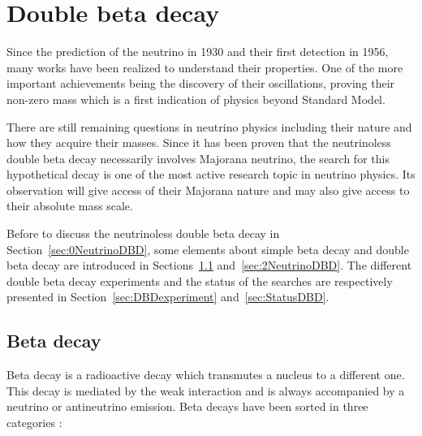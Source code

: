 \documentclass[main.tex]{subfiles}
\begin{document}
\chapter{Double beta decay}
 



\NI Since the prediction of the neutrino in 1930 and their first detection in 1956, many works have been realized to understand their properties. One of the more important achievements being the discovery of their oscillations, proving their non-zero mass which is a first indication of physics beyond Standard Model. 


\bigskip


\NI There are still remaining questions in neutrino physics including their nature and how they acquire their masses. Since it has been proven that the neutrinoless double beta decay necessarily involves Majorana neutrino, the search for this hypothetical decay is one of the most active research topic in neutrino physics. Its observation will give access of their Majorana nature and may also give access to their absolute mass scale.


\bigskip


\NI Before to discuss the neutrinoless double beta decay in Section~\ref{sec:0NeutrinoDBD}, some elements about simple beta decay and double beta decay are introduced in Sections~\ref{sec:betaDecay} and~\ref{sec:2NeutrinoDBD}. The different double beta decay experiments and the status of the searches are respectively presented in Section~\ref{sec:DBDexperiment} and~\ref{sec:StatusDBD}.


\section{Beta decay}\label{sec:betaDecay}


\NI Beta decay is a radioactive decay which transmutes a nucleus to a different one. This decay is mediated by the weak interaction and is always accompanied by a neutrino or antineutrino emission. Beta decays have been sorted in three categories :
\end{document}
